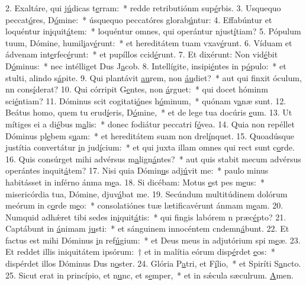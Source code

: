 2. Exaltáre, qui j\uline{ú}dicas t\uline{e}rram:~* redde retributiónm sup\uline{é}rbis.
3. Usquequo peccat\uline{ó}res, D\uline{ó}mine:~* úsquequo peccatóres glorab\uline{ú}ntur:
4. Effabúntur et loquéntur in\uline{i}quit\uline{á}tem:~* loquéntur omnes, qui operántur njust\uline{í}tiam?
5. Pópulum tuum, Dómine, humil\uline{i}av\uline{é}runt:~* et hereditátem tuam vxav\uline{é}runt.
6. Víduam et ádvenam int\uline{e}rfec\uline{é}runt:~* et pupíllos ccid\uline{é}runt.
7. Et dixérunt: Non vid\uline{é}bit D\uline{ó}minus:~* nec intélliget Dus J\uline{a}cob.
8. Intellígite, insipi\uline{é}ntes in p\uline{ó}pulo:~* et stulti, alindo s\uline{á}pite.
9. Qui plantávit \uline{au}rem, non \uline{áu}diet?~* aut qui finxit óculum, nn cons\uline{í}derat?
10. Qui córripit G\uline{e}ntes, non \uline{á}rguet:~* qui docet hóminm sci\uline{é}ntiam?
11. Dóminus scit cogitati\uline{ó}nes h\uline{ó}minum,~* quónam v\uline{a}næ sunt.
12. Beátus homo, quem tu erud\uline{í}eris, D\uline{ó}mine,~* et de lege tua docúris \uline{e}um.
13. Ut mítiges ei a di\uline{é}bus m\uline{a}lis:~* donec fodiátur peccatri f\uline{ó}vea.
14. Quia non repéllet Dóminus pl\uline{e}bem s\uline{u}am:~* et hereditátem suam non drel\uline{í}nquet.
15. Quoadúsque justítia convertátur \uline{i}n jud\uline{í}cium:~* et qui juxta illam omnes qui rect sunt c\uline{o}rde.
16. Quis consúrget mihi advérsus m\uline{a}lign\uline{á}ntes?~* aut quis stabit mecum advérsus operántes inquit\uline{á}tem?
17. Nisi quia Dómin\uline{u}s adj\uline{ú}vit me:~* paulo minus habitásset in inférno ánma m\uline{e}a.
18. Si dicébam: Motus \uline{e}st pes m\uline{e}us:~* misericórdia tua, Dómine, djuv\uline{á}bat me.
19. Secúndum multitúdinem dolórum meórum in c\uline{o}rde m\uline{e}o:~* consolatiónes tuæ lætificavérunt ánmam m\uline{e}am.
20. Numquid adhǽret tibi sedes in\uline{i}quit\uline{á}tis:~* qui fingis labórem n præc\uline{é}pto?
21. Captábunt in \uline{á}nimam j\uline{u}sti:~* et sánguinem innocéntem cndemn\uline{á}bunt.
22. Et factus est mihi Dóminus \uline{i}n ref\uline{ú}gium:~* et Deus meus in adjutórium spi m\uline{e}æ.
23. Et reddet illis iniquitátem ipsórum:~† et in malítia eórum disp\uline{é}rdet \uline{e}os:~* dispérdet illos Dóminus Dus n\uline{o}ster.
24. Glória P\uline{a}tri, et F\uline{í}lio,~* et Spiríti S\uline{a}ncto.
25. Sicut erat in princípio, et n\uline{u}nc, et s\uline{e}mper,~* et in sǽcula sæculrum. \uline{A}men.
